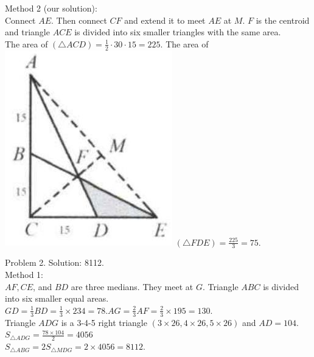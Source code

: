 \documentclass[10pt]{article}
\begin{document}
Method 2 (our solution):\\
Connect \(A E\). Then connect \(C F\) and extend it to meet \(A E\) at \(M\). \(F\) is the centroid and triangle \(A C E\) is divided into six smaller triangles with the same area.\\
The area of \((\triangle A C D)=\frac{1}{2} \cdot 30 \cdot 15=225\). The area of\\
\includegraphics[max width=\textwidth]{2025_04_17_97bc1f7e44d93c271a88g-017} \((\triangle F D E)=\frac{225}{3}=75\).

Problem 2. Solution: 8112.\\
Method 1:\\
\(A F, C E\), and \(B D\) are three medians. They meet at \(G\). Triangle \(A B C\) is divided into six smaller equal areas. \(G D=\frac{1}{3} B D=\frac{1}{3} \times 234=78 . A G=\frac{2}{3} A F=\frac{2}{3} \times 195=130\).\\
Triangle \(A D G\) is a 3-4-5 right triangle \((3 \times 26,4 \times 26,5 \times 26)\) and \(A D=104\).\\
\(S_{\triangle A D G}=\frac{78 \times 104}{2}=4056\)\\
\(S_{\triangle A B G}=2 S_{\triangle M D G}=2 \times 4056=8112\).
\end{document}
